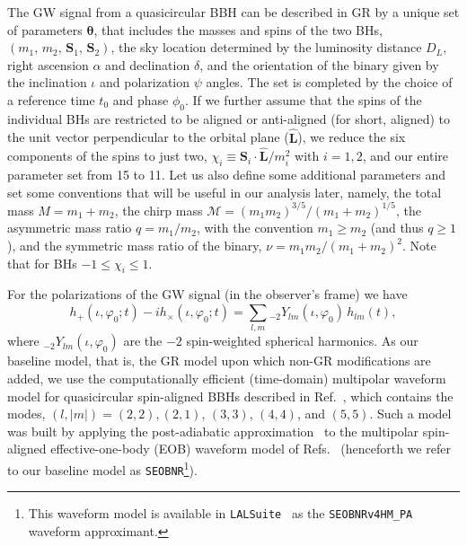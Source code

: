 \documentclass[twocolumn,
               prd,
               aps,
               superscriptaddress,
               tightenlines,
               nofootinbib,
               eqsecnum,
               amsfonts,
               amsmath,
               longbibliography]{revtex4-1}
\newcommand{\SEOB}{\texttt{SEOBNR}}
\newcommand{\abcomm}[1]{{\textcolor{red}{{[AB: #1]}}}}
\begin{document}
The GW signal from a quasicircular BBH can be described  in GR by a unique set of
parameters $\bm{\theta}$, that includes the masses and spins of the two BHs,
$(m_1,\, m_2,\, \mathbf{S}_1,\, \mathbf{S}_2)$, the sky location determined by the
luminosity distance $D_L$,
right ascension $\alpha$ and declination $\delta$,
and the orientation of the binary given by the inclination $\iota$ and polarization $\psi$
angles.
%
The set is completed by the choice of a reference time $t_0$ and phase
$\phi_0$. If we further assume that the spins of the individual BHs are
restricted to be aligned or anti-aligned (for short, aligned) to the unit vector
perpendicular to the orbital plane ($\mathbf{\hat{L}}$), we reduce the six
components of the spins to just two, $\chi_i \equiv \mathbf{S}_i\cdot \mathbf{\hat{L}} /m_i^2$ with $i = 1,2$,
and our entire parameter set from 15 to 11.
%
Let us also define some additional parameters and set some conventions that
will be useful in our analysis later, namely, the total mass
%
$M=m_1+m_2$,
%
the chirp mass
%
$\mathcal {M}=(m_{1}m_{2})^{3/5}/(m_{1}+m_{2})^{1/5}$,
%
the asymmetric mass ratio $q=m_1/m_2$, with the convention $m_1 \geqslant m_2$ (and thus $q \geqslant 1$),
and the symmetric mass ratio of the binary, $\nu = m_1m_2/(m_1+m_2)^2$. Note that for BHs $-1 \leqslant \chi_i \leqslant 1$.

For the polarizations of the GW signal (in the observer's frame) we have
%
\begin{equation}
h_+(\iota,\varphi_0;t ) - i h_\times(\iota,\varphi_0;t) = \sum_{l, m} {}_{-\!2}Y_{l m}(\iota,\varphi_0)\, h_{l m}(t),
\end{equation}
%
where ${}_{-\!2}Y_{l m}(\iota,\varphi_0)$ are the $-2$ spin-weighted spherical
harmonics.
%
%
As our baseline model, that is, the GR model upon which non-GR modifications
are added, we use the computationally efficient (time-domain) multipolar
waveform model for quasicircular spin-aligned BBHs described in
Ref.~\cite{Mihaylov:2021bpf}, which contains the modes, $(l, |m|)=(2,2),(2,1)$, $(3,3)$, $(4,4)$,
and $(5,5)$. Such a model was built by applying the post-adiabatic approximation~\cite{Nagar:2018gnk}
to the multipolar spin-aligned effective-one-body (EOB) waveform model of Refs.~\cite{Bohe:2016gbl,Cotesta:2018fcv} (henceforth we refer to our baseline model as \SEOB{}\footnote{This waveform
model is available in \texttt{LALSuite}~\cite{lalsuite} as the \texttt{SEOBNRv4HM\_PA}
waveform approximant.}).
\end{document}
